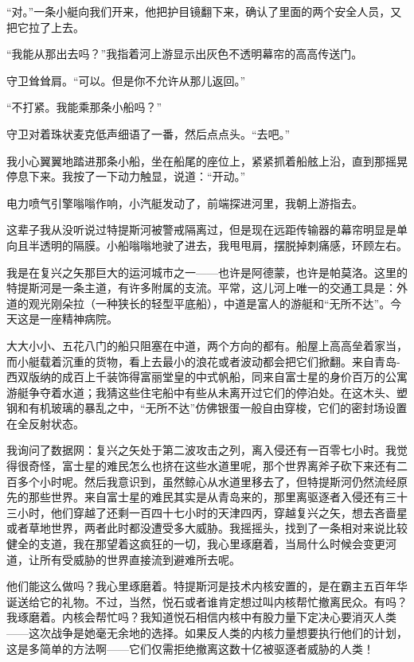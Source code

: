 \documentclass[AutoFakeBold=true]{book}
\begin{document}
``对。''一条小艇向我们开来，他把护目镜翻下来，确认了里面的两个安全人员，又把它拉了上去。

``我能从那出去吗？''我指着河上游显示出灰色不透明幕帘的高高传送门。

守卫耸耸肩。``可以。但是你不允许从那儿返回。''

``不打紧。我能乘那条小船吗？''

守卫对着珠状麦克低声细语了一番，然后点点头。``去吧。''

我小心翼翼地踏进那条小船，坐在船尾的座位上，紧紧抓着船舷上沿，直到那摇晃停息下来。我按了一下动力触显，说道：``开动。''

电力喷气引擎嗡嗡作响，小汽艇发动了，前端探进河里，我朝上游指去。

这辈子我从没听说过特提斯河被警戒隔离过，但是现在远距传输器的幕帘明显是单向且半透明的隔膜。小船嗡嗡地驶了进去，我甩甩肩，摆脱掉刺痛感，环顾左右。

我是在复兴之矢那巨大的运河城市之一——也许是阿德蒙，也许是帕莫洛。这里的特提斯河是一条主道，有许多附属的支流。平常，这儿河上唯一的交通工具是：外道的观光刚朵拉（一种狭长的轻型平底船），中道是富人的游艇和``无所不达''。今天这是一座精神病院。

大大小小、五花八门的船只阻塞在中道，两个方向的都有。船屋上高高垒着家当，而小艇载着沉重的货物，看上去最小的浪花或者波动都会把它们掀翻。来自青岛-西双版纳的成百上千装饰得富丽堂皇的中式帆船，同来自富士星的身价百万的公寓游艇争夺着水道；我猜这些住宅船中有些从未离开过它们的停泊处。在这木头、塑钢和有机玻璃的暴乱之中，``无所不达''仿佛银蛋一般自由穿梭，它们的密封场设置在全反射状态。

我询问了数据网：复兴之矢处于第二波攻击之列，离入侵还有一百零七小时。我觉得很奇怪，富士星的难民怎么也挤在这些水道里呢，那个世界离斧子砍下来还有二百多个小时呢。然后我意识到，虽然鲸心从水道里移去了，但特提斯河仍然流经原先的那些世界。来自富士星的难民其实是从青岛来的，那里离驱逐者入侵还有三十三小时，他们穿越了还剩一百四十七小时的天津四丙，穿越复兴之矢，想去吝啬星或者草地世界，两者此时都没遭受多大威胁。我摇摇头，找到了一条相对来说比较健全的支道，我在那望着这疯狂的一切，我心里琢磨着，当局什么时候会变更河道，让所有受威胁的世界直接流到避难所去呢。

{\kaishu 他们能这么做吗？}我心里琢磨着。特提斯河是技术内核安置的，是在霸主五百年华诞送给它的礼物。不过，当然，悦石或者谁肯定想过叫内核帮忙撤离民众。{\kaishu 有吗？}我琢磨着。内核会帮忙吗？我知道悦石相信内核中有股力量下定决心要消灭人类——这次战争是她毫无余地的选择。如果反人类的内核力量想要执行他们的计划，这是多简单的方法啊——它们仅需拒绝撤离这数十亿被驱逐者威胁的人类！
\end{document}
